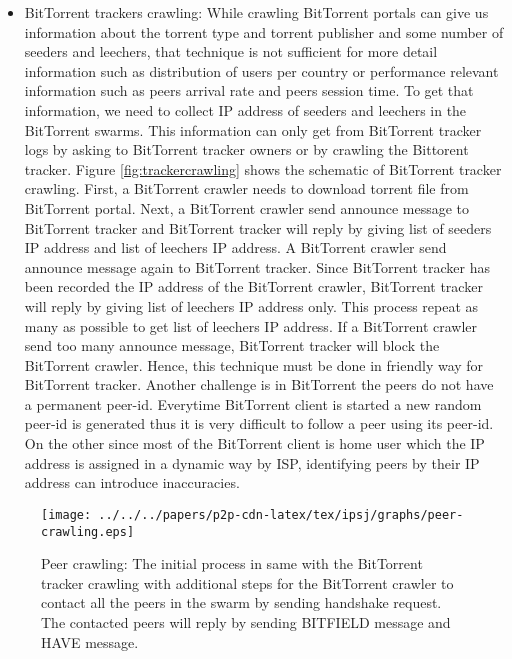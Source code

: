 \begin{itemize}
\item BitTorrent trackers crawling:
While crawling BitTorrent portals can give us information about the torrent type and torrent publisher and some number of seeders and leechers, that technique is not sufficient for more detail information such as distribution of users per country or performance relevant information such as peers arrival rate and peers session time.
To get that information, we need to collect IP address of seeders and leechers in the BitTorrent swarms.  
This information can only get from BitTorrent tracker logs by asking to BitTorrent tracker owners or by crawling the Bittorent tracker.
Figure \ref{fig:trackercrawling} shows the schematic of BitTorrent tracker crawling.  
First, a BitTorrent crawler needs to download torrent file from BitTorrent portal.  
Next, a BitTorrent crawler send announce message to BitTorrent tracker and BitTorrent tracker will reply by giving list of seeders IP address and list of leechers IP address.  
A BitTorrent crawler send announce message again to BitTorrent tracker. 
Since BitTorrent tracker has been recorded the IP address of the BitTorrent crawler, BitTorrent tracker will reply by giving list of leechers IP address only. 
This process repeat as many as possible to get list of leechers IP address.
If a BitTorrent crawler send too many announce message, BitTorrent tracker will block the BitTorrent crawler. 
Hence, this technique must be done in friendly way for BitTorrent tracker.
Another challenge is in BitTorrent the peers do not have a permanent peer-id.  
Everytime BitTorrent client is started a new random peer-id is generated thus it is very difficult to follow a peer using its peer-id. 
On the other since most of the BitTorrent client is home user which the IP address is assigned in a dynamic way by ISP, identifying peers by their IP address can introduce inaccuracies. 
\end{itemize}

\begin{figure}[tb]
\begin{center}
\texttt{[image: ../../../papers/p2p-cdn-latex/tex/ipsj/graphs/peer-crawling.eps]}
\end{center}
\caption{Peer crawling: The initial process in same with the BitTorrent tracker crawling with additional steps for the BitTorrent crawler to contact all the peers in the swarm by sending handshake request. The contacted peers will reply by sending BITFIELD message and HAVE message.} 
\label{fig:peeercrawling}
\end{figure}

